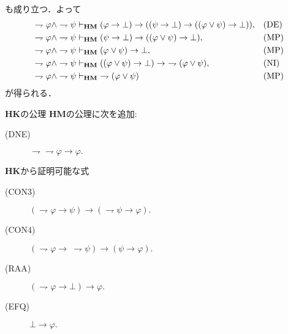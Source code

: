 \begin{sketch}[DM$\vee$]
\begin{align}
		\end{align}
		も成り立つ．よって
		\begin{align}
			\rightharpoondown \varphi \wedge \rightharpoondown \psi &\provable{\mbox{{\bf HM}}} 
				(\varphi \rightarrow \bot) \rightarrow ((\psi \rightarrow \bot) 
				\rightarrow ((\varphi \vee \psi) \rightarrow \bot)), && \mbox{(DE)}\\
			\rightharpoondown \varphi \wedge \rightharpoondown \psi &\provable{\mbox{{\bf HM}}} 
				(\psi \rightarrow \bot) \rightarrow ((\varphi \vee \psi) \rightarrow \bot), && \mbox{(MP)}\\
			\rightharpoondown \varphi \wedge \rightharpoondown \psi &\provable{\mbox{{\bf HM}}} 
				(\varphi \vee \psi) \rightarrow \bot, && \mbox{(MP)}\\
			\rightharpoondown \varphi \wedge \rightharpoondown \psi &\provable{\mbox{{\bf HM}}} 
				((\varphi \vee \psi) \rightarrow \bot) \rightarrow\ \rightharpoondown (\varphi \vee \psi), && \mbox{(NI)}\\
			\rightharpoondown \varphi \wedge \rightharpoondown \psi &\provable{\mbox{{\bf HM}}} 
				\ \rightharpoondown (\varphi \vee \psi) && \mbox{(MP)}
		\end{align}
		が得られる．
		\QED
	\end{sketch}
	
	\begin{itembox}[l]{{\bf HK}の公理}
		{\bf HM}の公理に次を追加:
		\begin{description}
			\item[(DNE)] $\rightharpoondown \rightharpoondown \varphi \rightarrow \varphi.$
		\end{description}
	\end{itembox}
	
	{\bf HK}から証明可能な式
	\begin{description}
		\item[(CON3)] $(\rightharpoondown \varphi \rightarrow \psi) \rightarrow (\rightharpoondown \psi \rightarrow \varphi).$
		\item[(CON4)] $(\rightharpoondown \varphi \rightarrow\ \rightharpoondown \psi) 
			\rightarrow (\psi \rightarrow \varphi).$
		\item[(RAA)] $(\rightharpoondown \varphi \rightarrow \bot) \rightarrow \varphi.$
		\item[(EFQ)] $\bot \rightarrow \varphi.$
	\end{description}
	

